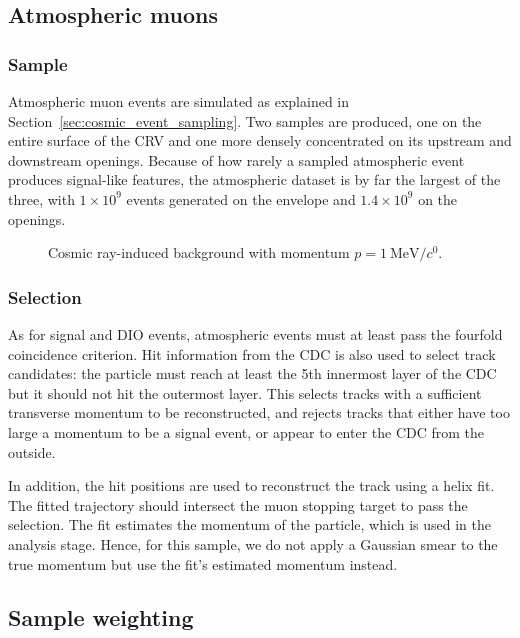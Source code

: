 \subsection{Atmospheric muons}

\subsubsection{Sample}

Atmospheric muon events are simulated as explained in
Section~\ref{sec:cosmic_event_sampling}. Two samples are produced, one on the
entire surface of the CRV and one more densely concentrated on its upstream and
downstream openings. Because of how rarely a sampled atmospheric event produces
signal-like features, the atmospheric dataset is by far the largest of the
three, with $1 \times 10^9$ events generated on the envelope and $1.4 \times
10^9$ on the openings.



\begin{figure}
    \centering
    
    \caption{Cosmic ray-induced background with momentum $p=\SI{1}{\MeV/\clight}$.}
    \label{fig:cosmic_bg_in_cydet}
\end{figure}

\subsubsection{Selection}
As for signal and DIO events, atmospheric events must at least pass the fourfold
coincidence criterion. Hit information from the CDC is also used to select
track candidates: the particle must reach at least the 5th innermost layer of
the CDC but it should not hit the outermost layer. This selects tracks with a
sufficient transverse momentum to be reconstructed, and rejects tracks that
either have too large a momentum to be a signal event, or appear to enter the
CDC from the outside. 

In addition, the hit positions are used to reconstruct the track using a helix
fit. The fitted trajectory should intersect the muon stopping target to pass the
selection. The fit estimates the momentum of the particle, which is used in the
analysis stage. Hence, for this sample, we do not apply a Gaussian smear to the
true momentum but use the fit's estimated momentum instead.


\subsection{Sample weighting}

